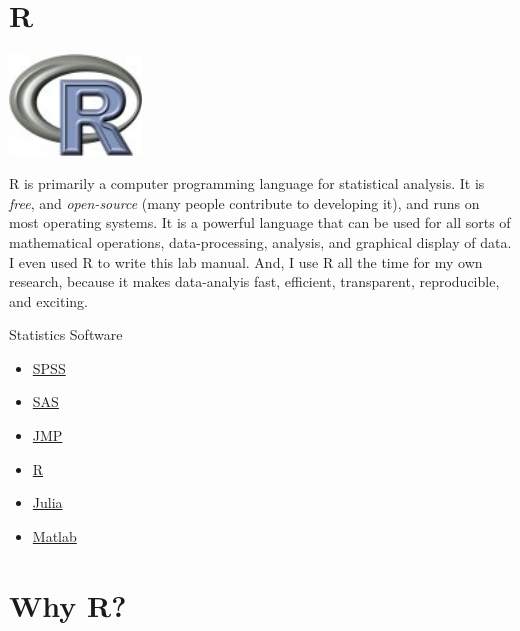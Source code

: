 \documentclass[]{book}
\providecommand{\tightlist}{%
  \setlength{\itemsep}{0pt}\setlength{\parskip}{0pt}}
\theoremstyle{definition}
\theoremstyle{definition}
\theoremstyle{definition}
\theoremstyle{remark}
\begin{document}
\section{R}\label{r}

\includegraphics[width=1.39in]{figures/rlogo}

R is primarily a computer programming language for statistical analysis.
It is \emph{free}, and \emph{open-source} (many people contribute to
developing it), and runs on most operating systems. It is a powerful
language that can be used for all sorts of mathematical operations,
data-processing, analysis, and graphical display of data. I even used R
to write this lab manual. And, I use R all the time for my own research,
because it makes data-analyis fast, efficient, transparent,
reproducible, and exciting.

Statistics Software

\begin{itemize}
\tightlist
\item
  \href{http://www-01.ibm.com/software/analytics/spss/}{SPSS}
\item
  \href{http://www.sas.com/en_us/home.html}{SAS}
\item
  \href{http://www.jmp.com}{JMP}
\item
  \href{http://www.r-project.org}{R}
\item
  \href{http://julialang.org}{Julia}
\item
  \href{http://www.mathworks.com/products/matlab/}{Matlab}
\end{itemize}

\section{Why R?}\label{why-r}
\end{document}
